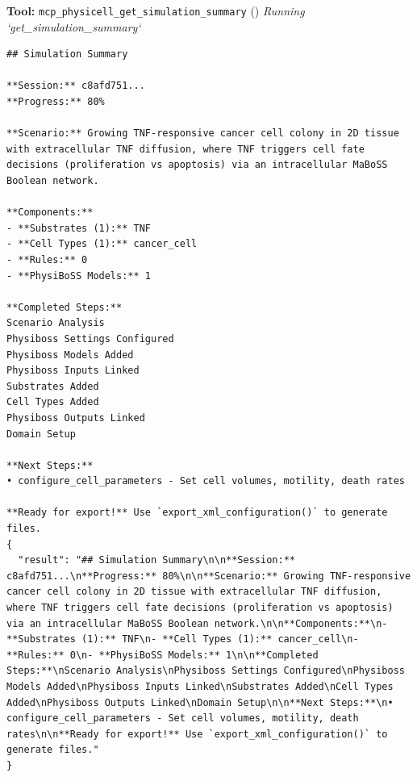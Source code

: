 \documentclass[11pt,a4paper]{article}
\begin{document}
\begin{toolokbox}
\textbf{Tool:} \texttt{mcp\_physicell\_get\_simulation\_summary} (\checkmark)
\textit{Running `get\_simulation\_summary`}
\begin{lstlisting}
## Simulation Summary

**Session:** c8afd751...
**Progress:** 80%

**Scenario:** Growing TNF-responsive cancer cell colony in 2D tissue with extracellular TNF diffusion, where TNF triggers cell fate decisions (proliferation vs apoptosis) via an intracellular MaBoSS Boolean network.

**Components:**
- **Substrates (1):** TNF
- **Cell Types (1):** cancer_cell
- **Rules:** 0
- **PhysiBoSS Models:** 1

**Completed Steps:**
Scenario Analysis
Physiboss Settings Configured
Physiboss Models Added
Physiboss Inputs Linked
Substrates Added
Cell Types Added
Physiboss Outputs Linked
Domain Setup

**Next Steps:**
• configure_cell_parameters - Set cell volumes, motility, death rates

**Ready for export!** Use `export_xml_configuration()` to generate files.
{
  "result": "## Simulation Summary\n\n**Session:** c8afd751...\n**Progress:** 80%\n\n**Scenario:** Growing TNF-responsive cancer cell colony in 2D tissue with extracellular TNF diffusion, where TNF triggers cell fate decisions (proliferation vs apoptosis) via an intracellular MaBoSS Boolean network.\n\n**Components:**\n- **Substrates (1):** TNF\n- **Cell Types (1):** cancer_cell\n- **Rules:** 0\n- **PhysiBoSS Models:** 1\n\n**Completed Steps:**\nScenario Analysis\nPhysiboss Settings Configured\nPhysiboss Models Added\nPhysiboss Inputs Linked\nSubstrates Added\nCell Types Added\nPhysiboss Outputs Linked\nDomain Setup\n\n**Next Steps:**\n• configure_cell_parameters - Set cell volumes, motility, death rates\n\n**Ready for export!** Use `export_xml_configuration()` to generate files."
}
\end{lstlisting}
\end{toolokbox}
\end{document}
